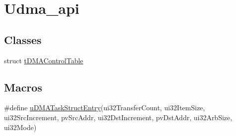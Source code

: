 \hypertarget{group__udma__api}{}\section{Udma\+\_\+api}
\label{group__udma__api}
\subsection*{Classes}
\begin{DoxyCompactItemize}
\item 
struct \hyperlink{structt_d_m_a_control_table}{t\+D\+M\+A\+Control\+Table}
\end{DoxyCompactItemize}
\subsection*{Macros}
\begin{DoxyCompactItemize}
\item 
\#define \hyperlink{group__udma__api_ga380924e76c7131a916adc9186eca5110}{u\+D\+M\+A\+Task\+Struct\+Entry}(ui32\+Transfer\+Count,                                                                  ui32\+Item\+Size,                                                                            ui32\+Src\+Increment,                                                                    pv\+Src\+Addr,                                                                              ui32\+Dst\+Increment,                                                                    pv\+Dst\+Addr,                                                                              ui32\+Arb\+Size,                                                                              ui32\+Mode)                                                                                  
\end{DoxyCompactItemize}
